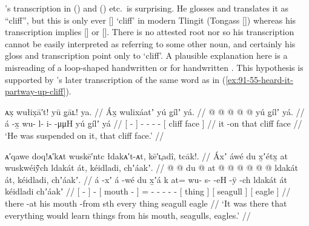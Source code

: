 \citeauthor{swanton:1909}’s transcription  in (\lastx) and (\nextx) etc.\ is surprising.
He glosses and translates it as “cliff”, but this is only ever  [] ‘cliff’ in modern Tlingit (Tongass  []) whereas his transcription implies  [] or  [].
There is no attested root  nor  so his transcription cannot be easily interpreted as referring to some other noun, and certainly his gloss and transcription point only to  ‘cliff’.
A plausible explanation here is a misreading of a loop-shaped handwritten  or  for handwritten .
This hypothesis is supported by \citeauthor{swanton:1909}’s later transcription of the same word as  in (\ref{ex:91-55-heard-it-partway-up-cliff}).

\ex\label{ex:91-44-suspended-on-cliff-face}%
%
\begingl
	\glpreamble	ᴀx̣ wułix̣ā′t! yū g̣āʟ! ya. //
	\glpreamble	Áx̱ wulixáatʼ yú g̱ílʼ yá. //
	\gla	{}  @ {} {}  @ {} @ {} @ {} @ {}
		{} yú g̱ílʼ yá. {} //
	\glb	{} á -x̱ {} wu- l- i-  -μμH
		{} yú g̱ílʼ yá {} //
	\glc	{}[  - {}] - - -  -
		{}[  cliff face {}] //
	\gld	{} it -on {}  {} {} {} {}
		{} that cliff face {} //
	\glft	‘He was suspended on it, that cliff face.’
		//
\endgl
\xe

\ex\label{ex:91-45-learned-from-him-seagull-eagle}%
%
\begingl
	\glpreamble	ᴀ′qawe doq!ᴀ′kᴀt wuskē′ntc łdakᴀ′t-ᴀt, kē′ʟ̣adî, tcāk!. //
	\glpreamble	Áxʼ áwé du x̱ʼétx̱ at wuskwéiÿ̃ch ldakát át, kéidladi, chʼáakʼ. //
	\gla	{}  @ {} {}  @ {}
		{} du  @ {} {} 
		at @  @ {} @ {} @ {} @ {} @ {}
		{} ldakát át, {}
		{} kéidladi, {} 
		{} chʼáakʼ. {} //
	\glb	{} á -xʼ {} á -wé
		{} du x̱ʼá k {}
		at= wu- s-  -eH -ÿ -ch
		{} ldakát át {}
		{} kéidladi {}
		{} chʼáakʼ {} //
	\glc	{}[  - {}]  -
		{}[  mouth - {}]
		= - -  - - -
		{}[  thing {}]
		{}[ seagull {}]
		{}[ eagle {}] //
	\gld	{} there -at {}  {}
		{} his mouth -from {}
		sth\•  {} {} {} {} {}
		{} every thing {}
		{} seagull {}
		{} eagle {} //
	\glft	‘It was there that everything would learn things from his mouth, seagulls, eagles.’
		//
\endgl
\xe

